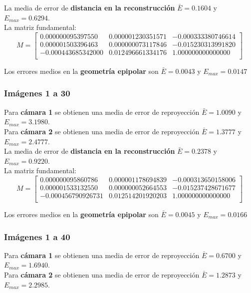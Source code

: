 \documentclass[a4paper, fontsize=11pt]{scrartcl} %
\numberwithin{equation}{section} %
\numberwithin{figure}{section} %
\numberwithin{table}{section} %
\begin{document}
	La media de error de \textbf{distancia en la reconstrucción} $\bar{E} = 0.1604$ y $E_{max} = 0.6294$.\\
	La matriz fundamental:
	\[
	M=
	\begin{bmatrix}
	0.000000095397550&	0.000001230351571&	-0.000333380746614 \\
	0.000001503396463&	0.000000073117846&	-0.015230313991820 \\
	-0.000443685342000&	0.012496661334176&	1.000000000000000  \\
	
	\end{bmatrix}
	\]
	
	Los errores medios en la \textbf{geometría epipolar} son $\bar{E} = 0.0043$ y $E_{max} = 0.0147$
	
	\subsubsection*{Imágenes 1 a 30}
	
	Para \textbf{cámara 1} se obtienen una media de error de reproyección $\bar{E} = 1.0090$ y $E_{max} = 3.1980$.\\
	Para \textbf{cámara 2} se obtienen una media de error de reproyección $\bar{E} = 1.3777$ y $E_{max} = 2.4777$.\\
	
	La media de error de \textbf{distancia en la reconstrucción} $\bar{E} = 0.2378$ y $E_{max} = 0.9220$.\\
	La matriz fundamental:
	\[
	M=
	\begin{bmatrix}
	0.000000095860786&	0.000001178694839&	-0.000313650158006 \\
	0.000001533132550&	0.000000052664553&	-0.015237428671677 \\
	-0.000456790926731&	0.012514201920203&	1.000000000000000  \\
	
	\end{bmatrix}
	\]
	
	Los errores medios en la \textbf{geometría epipolar} son $\bar{E} =  0.0045$ y $E_{max} = 0.0166$
	
	\subsubsection*{Imágenes 1 a 40}
	
	Para \textbf{cámara 1} se obtienen una media de error de reproyección $\bar{E} = 0.6700$ y $E_{max} = 1.6940$.\\
	Para \textbf{cámara 2} se obtienen una media de error de reproyección $\bar{E} = 1.2873$ y $E_{max} = 2.2985$.\\
	
\end{document}
